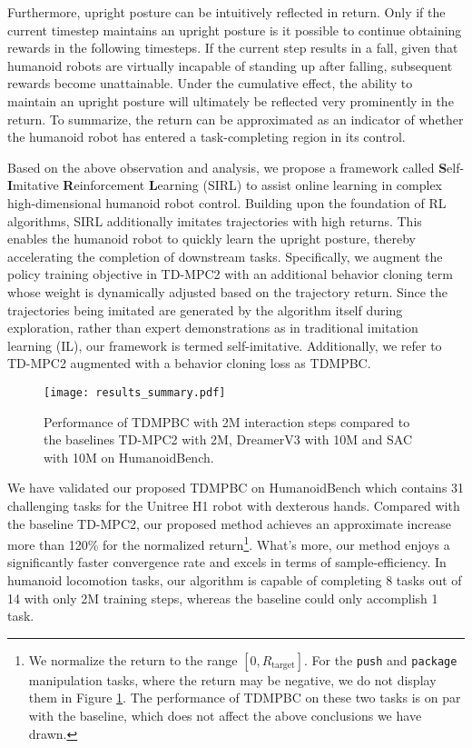 Furthermore, upright posture can be intuitively reflected in return. 
Only if the current timestep maintains an upright posture is it possible to continue obtaining rewards in the following timesteps. 
If the current step results in a fall, given that humanoid robots are virtually incapable of standing up after falling, subsequent rewards become unattainable. 
Under the cumulative effect, the ability to maintain an upright posture will ultimately be reflected very prominently in the return. 
To summarize, the return can be approximated as an indicator of whether the humanoid robot has entered a task-completing region in its control.

Based on the above observation and analysis, we propose a framework called \textbf{S}elf-\textbf{I}mitative \textbf{R}einforcement \textbf{L}earning (SIRL) to assist online learning in complex high-dimensional humanoid robot control.
Building upon the foundation of RL algorithms, SIRL additionally imitates trajectories with high returns.
This enables the humanoid robot to quickly learn the upright posture, thereby accelerating the completion of downstream tasks.
Specifically, we augment the policy training objective in TD-MPC2 \citep{hansen2023td, hansen2022temporal} with an additional behavior cloning term whose weight is dynamically adjusted based on the trajectory return. 
Since the trajectories being imitated are generated by the algorithm itself during exploration, rather than expert demonstrations as in traditional imitation learning (IL), our framework is termed self-imitative. 
Additionally, we refer to TD-MPC2 augmented with a behavior cloning loss as TDMPBC.


\begin{figure}[t]
  \centering
    \texttt{[image: results\_summary.pdf]}
    \vspace{-16pt}
  \caption{Performance of TDMPBC with 2M interaction steps compared to the baselines TD-MPC2 with 2M, DreamerV3 with 10M and SAC with 10M on HumanoidBench. }
  \label{fig:compare}
  \vspace{-16pt}
\end{figure}

We have validated our proposed TDMPBC on HumanoidBench \citep{sferrazza2024humanoidbench} which contains 31 challenging tasks for the Unitree H1 robot with dexterous hands.
Compared with the baseline TD-MPC2, our proposed method achieves an approximate increase more than 120\% for the normalized return\footnote{We normalize the return to the range $[0, R_{\text{target}}]$. For the \texttt{push} and \texttt{package} manipulation tasks, where the return may be negative, we do not display them in Figure \ref{fig:compare}. The performance of TDMPBC on these two tasks is on par with the baseline, which does not affect the above conclusions we have drawn.}.
What's more, our method enjoys a significantly faster convergence rate and excels in terms of sample-efficiency.
In humanoid locomotion tasks, our algorithm is capable of completing 8 tasks out of 14 with only 2M training steps, whereas the baseline could only accomplish 1 task.